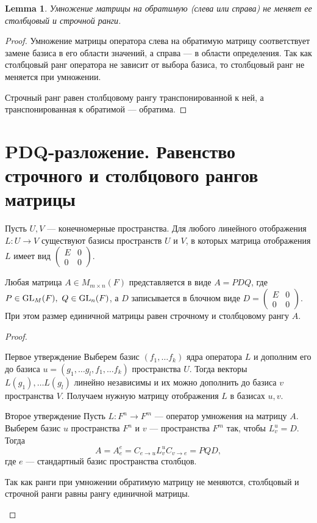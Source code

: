 \documentclass[11pt]{book}
\newcommand{\GL}{{\mathop{\text{\rm GL}}}}
\theoremstyle{definition}
\theoremstyle{plain}
\theoremstyle{plain}
\newtheorem{lm}{Lemma}
\theoremstyle{definition}
\theoremstyle{remark}
\begin{document}
\begin{lm}
    Умножение матрицы на обратимую (слева или справа) не меняет ее столбцовый и строчной ранги.
\end{lm}
\begin{proof}
    Умножение матрицы оператора слева на обратимую матрицу соответствует замене базиса в его области значений, а справа --- в области определения. Так как столбцовый ранг оператора не зависит от выбора базиса, то столбцовый ранг не меняется при умножении.

    Строчный ранг равен столбцовому рангу транспонированной к ней, а транспонированная к обратимой --- обратима.
\end{proof}
\section{PDQ-разложение. Равенство строчного и столбцового рангов матрицы}
\begin{thm}
    Пусть $ U, V$ --- конечномерные пространства. Для любого линейного отображения $ L: U \to  V$ существуют базисы пространств $ U$ и  $ V$, в которых матрица  отображения $ L$ имеет вид  $
    \begin{pmatrix}
	E & 0 \\ 0 & 0
    \end{pmatrix}$.

    Любая матрица $ A \in M_{m\times n}(F)$ представляется в виде $ A = PDQ$, где  $ P \in \GL_M(F), ~ Q \in \GL_n(F)$, а $ D$ записывается в блочном виде  $ D =
    \begin{pmatrix}
	E & 0 \\ 0 & 0
    \end{pmatrix}$. При этом размер единичной матрицы равен строчному и столбцовому рангу $ A$.
\end{thm}
\begin{proof}
    $ $
    \begin{description}
	\item $\boxed{\text{Первое утверждение}}$ Выберем базис $ (f_1, \ldots f_k)$ ядра оператора $ L$ и дополним его до базиса  $ u = (g_1, \ldots g_l, f_1, \ldots f_k)$ пространства $ U$.
	    Тогда векторы $ L(g_1), \ldots L(g_l)$ линейно независимы и их можно дополнить до базиса $ v$ пространства  $ V$. Получаем нужную матрицу отображения  $ L$ в базисах  $ u, v$.
	\item  $ \boxed{\text{Второе утверждение}}$ Пусть $ L: F^{n} \to  F^{m}$ --- оператор умножения на матрицу $ A$. Выберем базис  $ u$ пространства  $ F^{n}$ и $ v$ --- пространства $ F^{m}$ так, чтобы $ L_v^{u} = D$.
	    Тогда
	    \[
		A = A_{e}^{e} = C_{e \to  u}L_{v}^{u}C_{v \to  e} = PQD
	    ,\]
	    где $ e$ --- стандартный базис пространства столбцов.

	    Так как ранги при умножении  обратимую матрицу не меняются, столбцовый и строчной ранги равны рангу единичной матрицы.
    \end{description}
\end{proof}
\end{document}
